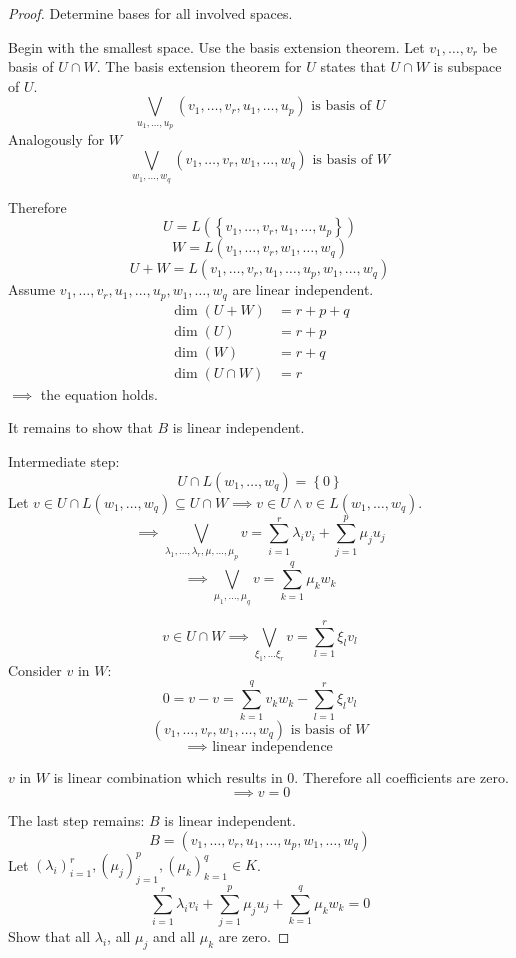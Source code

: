 \documentclass[a4paper,landscape,twocolumn]{article}
\newcommand\set[1]{\left\{#1\right\}}
\begin{document}
\begin{proof}
  Determine bases for all involved spaces.

  Begin with the smallest space. Use the basis extension theorem.
  Let $v_1, \dots, v_r$ be basis of $U \cap W$.
  The basis extension theorem for $U$ states that $U \cap W$ is subspace of $U$.
  \[ \bigvee_{u_1, \dots, u_p} (v_1, \dots, v_r, u_1, \dots, u_p) \text{ is basis of } U \]
  Analogously for $W$
  \[ \bigvee_{w_1, \dots, w_q} (v_1, \dots, v_r, w_1, \dots, w_q) \text{ is basis of } W \]

  Therefore
  \[ U = L(\set{v_1, \dots, v_r, u_1, \dots, u_p}) \]
  \[ W = L(v_1, \dots, v_r, w_1, \dots, w_q) \]
  \[ U + W = L(v_1, \dots, v_r, u_1, \dots, u_p, w_1, \dots, w_q) \]
  Assume $v_1, \dots, v_r, u_1, \dots, u_p, w_1, \dots, w_q$ are linear independent.
  \begin{align*}
        \dim(U+W) &= r + p + q \\
          \dim(U) &= r+p \\
          \dim(W) &= r+q \\
    \dim(U\cap W) &= r
  \end{align*}
  $\implies$ the equation holds.

  It remains to show that $B$ is linear independent.

  Intermediate step:
  \[ U \cap L(w_1, \dots, w_q) = \set{0} \]
  Let $v \in U \cap L(w_1, \dots, w_q) \subseteq U \cap W \implies v \in U \land v \in L(w_1, \dots, w_q)$.
  \[ \implies \bigvee_{\lambda_1, \dots, \lambda_r, \mu, \dots, \mu_p} v = \sum_{i=1}^r \lambda_i v_i + \sum_{j=1}^p \mu_j u_j \]
  \[ \implies \bigvee_{\mu_1, \dots, \mu_q} v = \sum_{k=1}^q \mu_k w_k \]

  \[ v \in U \cap W \implies \bigvee_{\xi_1, \dots \xi_r} v = \sum_{l=1}^r \xi_l v_l \]
  Consider $v$ in $W$:
  \[ 0 = v - v = \sum_{k=1}^q v_k w_k - \sum_{l=1}^r \xi_l v_l \]
  \[ (v_1, \dots, v_r, w_1, \dots, w_q) \text{ is basis of } W \]
  \[ \implies \text{ linear independence} \]

  $v$ in $W$ is linear combination which results in $0$. Therefore all coefficients are zero.
  \[ \implies v = 0 \]

  The last step remains: $B$ is linear independent.
  \[ B = (v_1, \dots, v_r, u_1, \dots, u_p, w_1, \dots, w_q) \]
  Let $(\lambda_i)^r_{i=1}, (\mu_j)^p_{j=1}, (\mu_k)_{k=1}^q \in K$.
  \[ \sum_{i=1}^r \lambda_i v_i + \sum_{j=1}^p \mu_j u_j + \sum_{k=1}^q \mu_k w_k = 0 \]
  Show that all $\lambda_i$, all $\mu_j$ and all $\mu_k$ are zero.


\end{proof}
\end{document}

